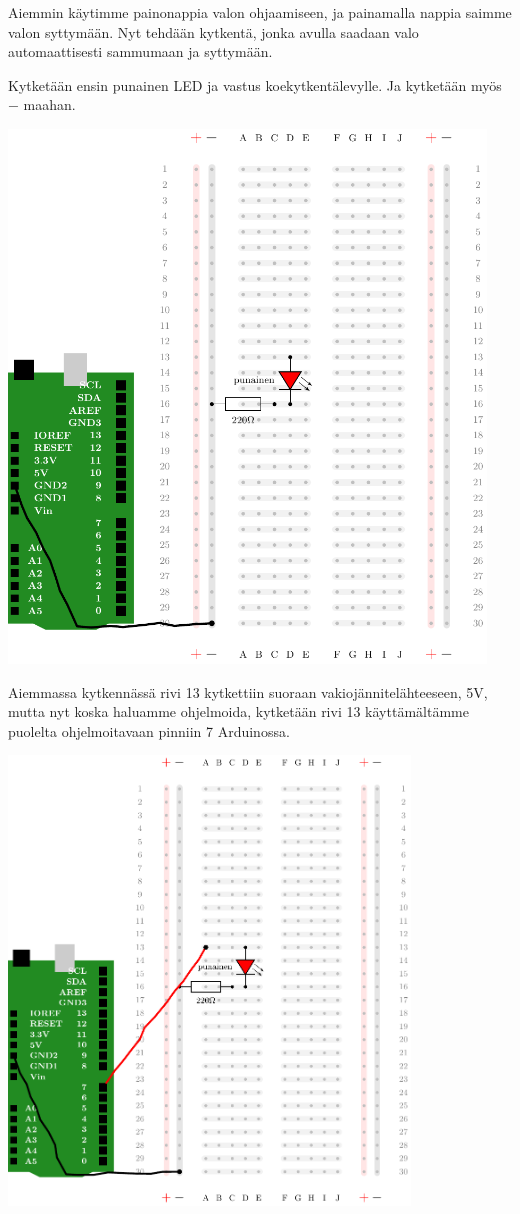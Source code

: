 Aiemmin käytimme painonappia valon ohjaamiseen, ja painamalla nappia saimme valon syttymään. Nyt tehdään kytkentä, jonka avulla saadaan valo automaattisesti sammumaan ja syttymään. 


Kytketään ensin punainen LED ja vastus koekytkentälevylle. Ja kytketään myös $-$ maahan.

\includegraphics[width=0.95\textwidth]{kuvat/kuva7.pdf}

Aiemmassa kytkennässä rivi 13 kytkettiin suoraan vakiojännitelähteeseen, 5V, mutta nyt koska haluamme ohjelmoida, kytketään rivi 13 käyttämältämme puolelta ohjelmoitavaan pinniin 7 Arduinossa.

\includegraphics[width=0.8\textwidth]{kuvat/kuva8.pdf}

